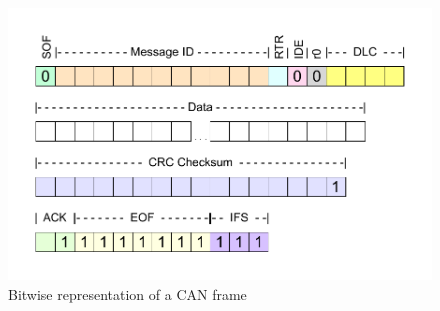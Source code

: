 \begin{figure}[h!]
	\centering
	\includegraphics[width = 0.9\linewidth]{graphics/CAN_frame_pdf}
	\caption{Bitwise representation of a CAN frame}
	\label{fig:CAN_frame_pdf}
\end{figure}

